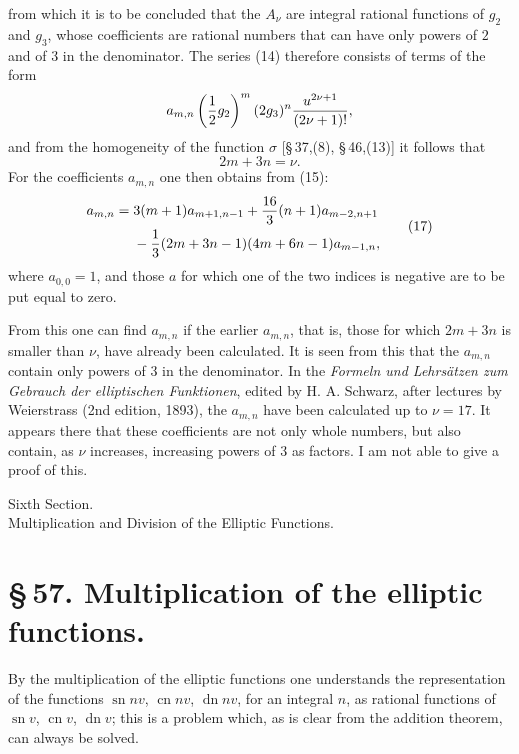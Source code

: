 \documentclass[11pt]{article}
\providecommand{\sn}{\operatorname{sn}}
\providecommand{\cn}{\operatorname{cn}}
\providecommand{\dn}{\operatorname{dn}}
\begin{document}
from which it is to be concluded that the $A_\nu$ are integral rational functions of $g_2$ and $g_3$, whose coefficients are rational numbers that can have only powers of $2$ and of $3$ in the denominator. The series (14) therefore consists of terms of the form
\[
a_{m,n}\left({1\over2}g_2\right)^m(2g_3)^n{u^{2\nu+1}\over(2\nu+1)!},
\]
and from the homogeneity of the function $\sigma$ [\S\,37,(8), \S\,46,(13)] it follows that
\begin{equation}
2m+3n=\nu.
\tag{16}
\end{equation}
For the coefficients $a_{m,n}$ one then obtains from (15):
\begin{equation}
\begin{aligned}
a_{m,n}={}&3(m+1)a_{m+1,n-1}+{16\over3}(n+1)a_{m-2,n+1}\\
&-{1\over3}(2m+3n-1)(4m+6n-1)a_{m-1,n},
\end{aligned}
\tag{17}
\end{equation}
where $a_{0,0}=1$, and those $a$ for which one of the two indices is negative are to be put equal to zero.

From this one can find $a_{m,n}$ if the earlier $a_{m,n}$, that is, those for which $2m+3n$ is smaller than $\nu$, have already been calculated. It is seen from this that the $a_{m,n}$ contain only powers of $3$ in the denominator. In the \emph{Formeln und Lehrs\"atzen zum Gebrauch der elliptischen Funktionen}, edited by H. A. Schwarz, after lectures by Weierstrass (2nd edition, 1893), the $a_{m,n}$ have been calculated up to $\nu=17$. It appears there that these coefficients are not only whole numbers, but also contain, as $\nu$ increases, increasing powers of $3$ as factors. I am not able to give a proof of this.




\begin{center}
{\large Sixth Section.}\\[0.7em]
{\Large Multiplication and Division of the Elliptic Functions.}
\end{center}

\section*{\S\,57. Multiplication of the elliptic functions.}

By the multiplication of the elliptic functions one understands the representation of the
functions $\sn n v$, $\cn n v$, $\dn n v$, for an integral $n$, as rational functions of
$\sn v$, $\cn v$, $\dn v$; this is a problem which, as is clear from the addition theorem,
can always be solved.
\end{document}
